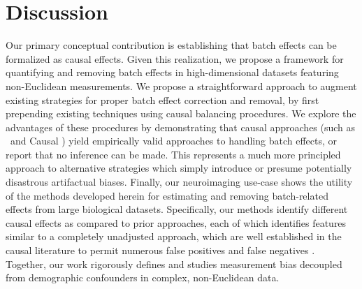 %
\clearpage
\section{Discussion}

Our primary conceptual contribution is establishing that batch effects can be formalized as causal effects.  Given this realization, we propose a framework for quantifying and removing batch effects in high-dimensional datasets featuring non-Euclidean measurements. We propose a straightforward approach to augment existing strategies for proper batch effect correction and removal, by first prepending existing techniques using causal balancing procedures. We explore the advantages of these procedures by demonstrating that causal approaches (such as \cccombat~and Causal \Dcorr) yield empirically valid approaches to handling batch effects, or report that no inference can be made. This represents a much more principled approach to alternative strategies which simply introduce or presume potentially disastrous artifactual biases. Finally, our neuroimaging use-case shows the utility of the methods developed herein for estimating and removing batch-related effects from large biological datasets. Specifically, our methods identify different causal effects as compared to prior approaches, each of which identifies features similar to a completely unadjusted approach, which are well established in the causal literature to permit numerous false positives and false negatives \cite{Ding2015Mar,Forstmeier2017Nov}. 
Together, our work rigorously defines and studies measurement bias decoupled from demographic confounders in complex, non-Euclidean data.


